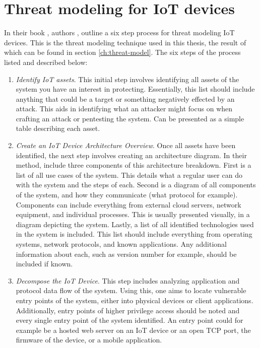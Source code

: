 \section{Threat modeling for IoT devices} \label{ch:method:threat-modeling}
In their book , authors \citeauthor{guzman2017iot}, outline a six step process for threat modeling IoT devices. This is the threat modeling technique used in this thesis, the result of which can be found in section \ref{ch:threat-model}. The six steps of the process listed and described below:
\begin{enumerate}
    \item \textit{Identify IoT assets}. This initial step involves identifying all assets of the system you have an interest in protecting. Essentially, this list should include anything that could be a target or something negatively effected by an attack. This aids in identifying what an attacker might focus on when crafting an attack or pentesting the system. Can be presented as a simple table describing each asset.
    \item \textit{Create an IoT Device Architecture Overview}. Once all assets have been identified, the next step involves creating an architecture diagram. In their method, \citeauthor{guzman2017iot} include three components of this architecture breakdown. First is a list of all use cases of the system. This details what a regular user can do with the system and the steps of each. Second is a diagram of all components of the system, and how they communicate (what protocol for example). Components can include everything from external cloud servers, network equipment, and individual processes. This is usually presented visually, in a diagram depicting the system. Lastly, a list of all identified technologies used in the system is included. This list should include everything from operating systems, network protocols, and known applications. Any additional information about each, such as version number for example, should be included if known.
    \item \textit{Decompose the IoT Device}. This step includes analyzing application and protocol data flow of the system. Using this, one aims to locate vulnerable entry points of the system, either into physical devices or client applications. Additionally, entry points of higher privilege access should be noted and every single entry point of the system identified. An entry point could for example be a hosted web server on an IoT device or an open TCP port, the firmware of the device, or a mobile application.

\end{enumerate}

